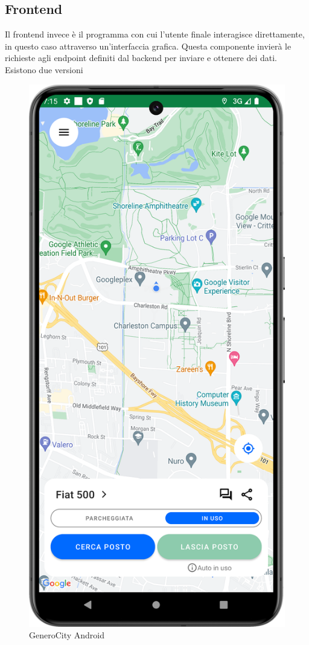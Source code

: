 \subsection{Frontend}
Il frontend invece è il programma con cui l'utente finale interagisce direttamente, in questo caso attraverso un'interfaccia grafica. Questa componente invierà le richieste agli endpoint definiti dal backend per inviare e ottenere dei dati. Esistono due versioni
\begin{figure}
    \centering
    \includegraphics[width=0.9\linewidth]{images/gc_main_activity.png}
    \caption{GeneroCity Android}
    \label{fig:main_screen}
\end{figure}
